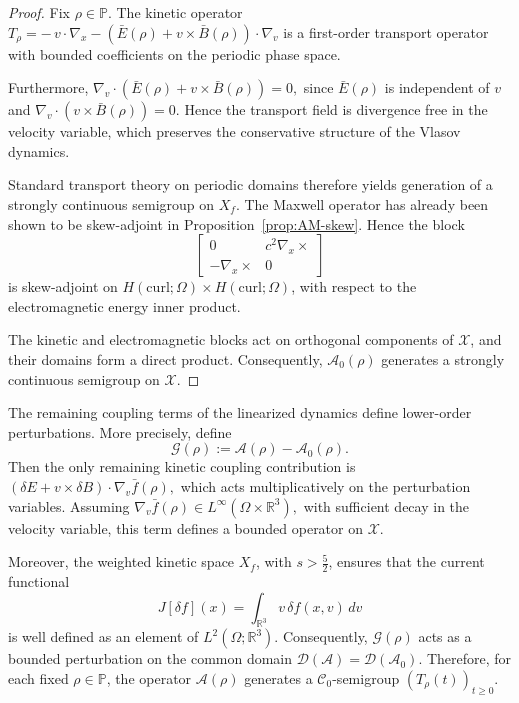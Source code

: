 \documentclass[AMA,Times2COL]{WileyNJDv5}
\begin{document}
\begin{proof}
Fix \(\rho\in\mathbb P\).
The kinetic operator
\(
T_\rho
=
-\,v\!\cdot\!\nabla_x
-
(\bar E(\rho)+v\times\bar B(\rho))\!\cdot\!\nabla_v
\)
is a first-order transport operator with bounded coefficients on the periodic phase space.


Furthermore,
\(
\nabla_v\!\cdot(\bar E(\rho)+v\times\bar B(\rho))=0,
\)
since \(\bar E(\rho)\) is independent of \(v\) and
\(
\nabla_v\!\cdot(v\times\bar B(\rho))=0.
\)
Hence the transport field is divergence free in the velocity variable, which preserves the conservative structure of the Vlasov dynamics.

Standard transport theory on periodic domains therefore yields generation of a strongly continuous semigroup on
\(
X_f
\).
The Maxwell operator has already been shown to be skew-adjoint in Proposition~\ref{prop:AM-skew}. Hence the block
\[
\begin{bmatrix}
0 & c^{2}\nabla_x\times\\
-\nabla_x\times & 0
\end{bmatrix}
\]
is skew-adjoint on
\(
H(\mathrm{curl};\Omega)\times H(\mathrm{curl};\Omega)
\),
with respect to the electromagnetic energy inner product.

The kinetic and electromagnetic blocks act on orthogonal components of \(\mathscr X\), and their domains form a direct product. Consequently, \(\mathcal A_0(\rho)\) generates a strongly continuous semigroup on \(\mathscr X\).
\end{proof}


The remaining coupling terms of the linearized dynamics define lower-order perturbations. More precisely, define
\[
\mathcal G(\rho)
:=
\mathcal A(\rho)-\mathcal A_0(\rho).
\]
Then the only remaining kinetic coupling contribution is
\(
(\delta E+v\times\delta B)\cdot\nabla_v\bar f(\rho),
\)
which acts multiplicatively on the perturbation variables.
Assuming
\(
\nabla_v\bar f(\rho)
\in
L^\infty(\Omega\times\mathbb R^3),
\)
with sufficient decay in the velocity variable, this term defines a bounded operator on \(\mathscr X\).


Moreover, the weighted kinetic space
\(X_f\), with \(s>\frac52\), ensures that the current functional
\[
J[\delta f](x)=\int_{\mathbb R^3}v\,\delta f(x,v)\,dv
\]
is well defined as an element of \(L^2(\Omega;\mathbb R^3)\). Consequently,
\(\mathcal G(\rho)\) acts as a bounded perturbation on the common domain
\(
\mathcal D(\mathcal A)
=
\mathcal D(\mathcal A_0).
\)
Therefore, for each fixed \(\rho\in\mathbb P\), the operator \(\mathcal A(\rho)\) generates a $\mathcal C_0$-semigroup \((T_\rho(t))_{t\ge0}\).
\end{document}
